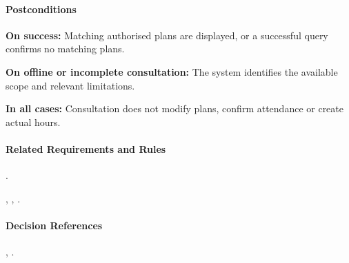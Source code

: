 \paragraph{Postconditions}

\textbf{On success:}
Matching authorised plans are displayed,
or a successful query confirms no matching plans.

\textbf{On offline or incomplete consultation:}
The system identifies the available scope
and relevant limitations.

\textbf{In all cases:}
Consultation does not modify plans,
confirm attendance or create actual hours.

\paragraph{Related Requirements and Rules}
\hyperref[fr:028]{}.

\hyperref[br:017]{}, \hyperref[br:019]{}, \hyperref[br:021]{}.

\paragraph{Decision References}
, .
